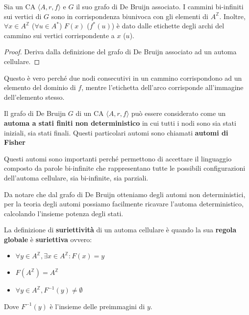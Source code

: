 \begin{nota}
    Sia un CA $\langle A,r,f\rangle$ e $G$ il suo grafo di De Bruijn associato.
    I cammini bi-infiniti sui vertici di $G$ sono in corrispondenza biunivoca
    con gli elementi di $A^\mathbb{Z}$. Inoltre, $\forall x\in A^\mathbb{Z}$ ($ \forall u\in A^\ast$)
    $F(x)$ ($f^\ast(u)$) è dato dalle etichette degli archi del cammino sui vertici
    corrispondente a $x$ ($u$).
    \begin{proof}
        Deriva dalla definizione del grafo di De Bruijn associato ad un automa cellulare.
    \end{proof}
\end{nota}

Questo è vero perché due nodi consecutivi in un cammino corrispondono ad un elemento
del dominio di $f$, mentre l'etichetta dell'arco corrisponde all'immagine dell'elemento
stesso.

\begin{nota}
    Il grafo di De Bruijn $G$ di un CA $\langle A,r,f\rangle$ può essere considerato
    come un \textbf{automa a stati finiti non deterministico} in cui tutti i nodi sono sia stati iniziali, sia
    stati finali. Questi particolari automi sono chiamati \textbf{automi di Fisher}
\end{nota}

Questi automi sono importanti perché permettono di accettare il linguaggio composto
da parole bi-infinite che rappresentano tutte le possibili configurazioni dell'automa
cellulare, sia bi-infinite, sia parziali.

Da notare che dal grafo di De Bruijn otteniamo degli automi non deterministici,
per la teoria degli automi possiamo facilmente ricavare l'automa deterministico,
calcolando l'insieme potenza degli stati.

\begin{definizione} 
    La definizione di \textbf{suriettività} di un automa cellulare è quando la sua
    \textbf{regola globale} è \textbf{suriettiva} ovvero:
    \begin{itemize}
        \item $\forall y\in A^\mathbb{Z},\exists x\in A^\mathbb{Z}: F(x) = y$
        \item $F(A^\mathbb{Z}) = A^\mathbb{Z}$
        \item $\forall y \in A^\mathbb{Z}, F^{-1}(y) \ne \emptyset $
    \end{itemize}
    Dove $F^{-1}(y)$ è l'insieme delle preimmagini di $y$.
\end{definizione}

